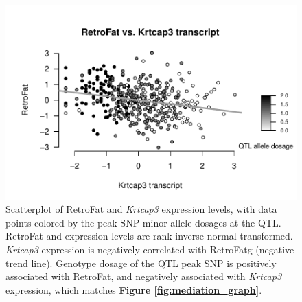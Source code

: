 \begin{figure}
\centering
\includegraphics[width=\textwidth, trim={0in 0in 0 0.75in}, clip]{figures/5-hsrats/Krtcap3_scatter.pdf}
\caption[Scatterplot of RetroFat by \textit{Krtcap3} shows signs of direct mediation]{Scatterplot of RetroFat and \textit{Krtcap3} expression levels, with data points colored by the peak SNP minor allele dosages at the QTL. RetroFat and expression levels are rank-inverse normal transformed. \textit{Krtcap3} expression is negatively correlated with RetroFatg (negative trend line). Genotype dosage of the QTL peak SNP is positively associated with RetroFat, and negatively associated with \textit{Krtcap3} expression, which matches \textbf{Figure \ref{fig:mediation_graph}}. \label{fig:krtcap3}}
\end{figure}


